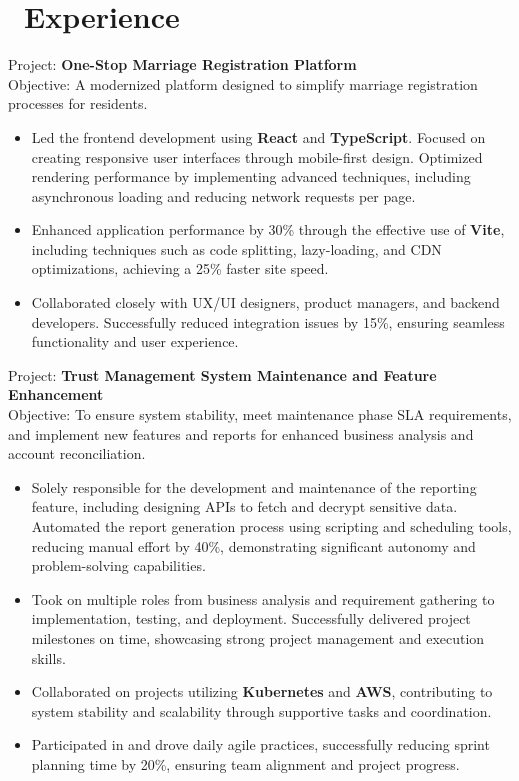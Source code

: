 \documentclass{resume}
\begin{document}
\onehalfspacing
{}



\section{\faUsers\ Experience}
\role{Software Developer}

Project: \textbf{One-Stop Marriage Registration Platform} \\
Objective: A modernized platform designed to simplify marriage registration processes for residents.
\begin{itemize}
  \item Led the frontend development using \textbf{React} and \textbf{TypeScript}. Focused on creating responsive user interfaces through mobile-first design. Optimized rendering performance by implementing advanced techniques, including asynchronous loading and reducing network requests per page.
  \item Enhanced application performance by 30\% through the effective use of \textbf{Vite}, including techniques such as code splitting, lazy-loading, and CDN optimizations, achieving a 25\% faster site speed.
  \item Collaborated closely with UX/UI designers, product managers, and backend developers. Successfully reduced integration issues by 15\%, ensuring seamless functionality and user experience.
\end{itemize}

Project: \textbf{Trust Management System Maintenance and Feature Enhancement} \\
Objective: To ensure system stability, meet maintenance phase SLA requirements, and implement new features and reports for enhanced business analysis and account reconciliation.
\begin{itemize}
  \item Solely responsible for the development and maintenance of the reporting feature, including designing APIs to fetch and decrypt sensitive data. Automated the report generation process using scripting and scheduling tools, reducing manual effort by 40\%, demonstrating significant autonomy and problem-solving capabilities.
  \item Took on multiple roles from business analysis and requirement gathering to implementation, testing, and deployment. Successfully delivered project milestones on time, showcasing strong project management and execution skills.
  \item Collaborated on projects utilizing \textbf{Kubernetes} and \textbf{AWS}, contributing to system stability and scalability through supportive tasks and coordination.
  \item Participated in and drove daily agile practices, successfully reducing sprint planning time by 20\%, ensuring team alignment and project progress.
\end{itemize}
\end{document}
